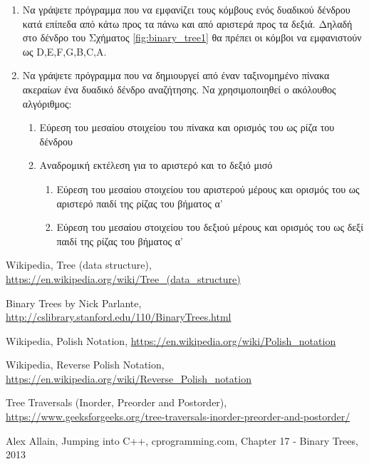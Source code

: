 \begin{enumerate}
\item Να γράψετε πρόγραμμα που να εμφανίζει τους κόμβους ενός δυαδικού δένδρου κατά επίπεδα από κάτω προς τα πάνω και από αριστερά προς τα δεξιά. Δηλαδή στο δένδρο του Σχήματος \ref{fig:binary_tree1} θα πρέπει οι κόμβοι να εμφανιστούν ως D,E,F,G,B,C,A.
\item Να γράψετε πρόγραμμα που να δημιουργεί από έναν ταξινομημένο πίνακα ακεραίων ένα δυαδικό δένδρο αναζήτησης. Να χρησιμοποιηθεί ο ακόλουθος αλγόριθμος:
	\begin{enumerate}
	\item Εύρεση του μεσαίου στοιχείου του πίνακα και ορισμός του ως ρίζα του δένδρου
	\item Αναδρομική εκτέλεση για το αριστερό και το δεξιό μισό
		\begin{enumerate}
		\item Εύρεση του μεσαίου στοιχείου του αριστερού μέρους και ορισμός του ως 		αριστερό παιδί της ρίζας του βήματος α'
		\item Εύρεση του μεσαίου στοιχείου του δεξιού μέρους και ορισμός του ως δεξί παιδί της ρίζας του βήματος α'
		\end{enumerate}
	\end{enumerate}
\end{enumerate}

\begin{thebibliography}{9}
Wikipedia, Tree (data structure), \href{https://en.wikipedia.org/wiki/Tree_(data_structure)}{https://en.wikipedia.org/wiki/Tree\_(data\_structure)}

Binary Trees by Nick Parlante, \href{http://cslibrary.stanford.edu/110/BinaryTrees.html}{http://cslibrary.stanford.edu/110/BinaryTrees.html}

Wikipedia, Polish Notation, \href{https://en.wikipedia.org/wiki/Polish_notation}{https://en.wikipedia.org/wiki/Polish\_notation}

Wikipedia, Reverse Polish Notation, \href{https://en.wikipedia.org/wiki/Reverse_Polish_notation}{https://en.wikipedia.org/wiki/Reverse\_Polish\_notation}

Tree Traversals (Inorder, Preorder and Postorder), \href{https://www.geeksforgeeks.org/tree-traversals-inorder-preorder-and-postorder/}{https://www.geeksforgeeks.org/tree-traversals-inorder-preorder-and-postorder/}

Alex Allain, Jumping into C++, cprogramming.com, Chapter 17 - Binary Trees, 2013

\end{thebibliography}

